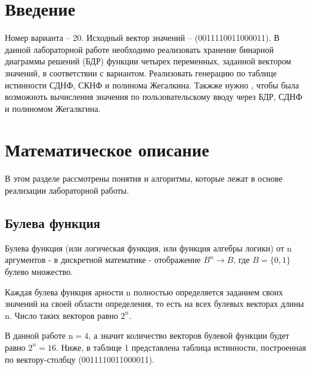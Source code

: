 \documentclass[10pt,a4paper,final]{article} %
\begin{document}
	\tableofcontents
	
	\newpage
	\section* {Введение}
	\par Номер варианта -- 20. Исходный вектор значений -- (0011110011000011). В данной лабораторной работе необходимо реализовать хранение бинарной диаграммы решений (БДР) функции четырех переменных, заданной вектором значений, в соответствии с вариантом. Реализовать генерацию по таблице истинности СДНФ, СКНФ и полинома Жегалкина. Такжже нужно , чтобы была возможноть вычисления значения по пользовательскому вводу через БДР, СДНФ и полиномом Жегалкгина.
	
	\newpage
	\section {Математическое описание}
	В этом разделе рассмотрены понятия и алгоритмы, которые лежат в основе реализации лабораторной работы.
	
	\subsection{Булева функция}
	Булева функция (или логическая функция, или функция алгебры логики) от $\mathrm{n}$ аргументов - в дискретной математике - отображение $B^{n} \rightarrow B$, где $B=\{0,1\}$ булево множество.
	
	Каждая булева функция арности n полностью определяется заданием своих значений на своей области определения, то есть на всех булевых векторах длины $\mathrm{n}$. Число таких векторов равно $2^{n}$.
	
	В данной работе $\mathrm{n}=4$, а значит количество векторов булевой функции будет равно $2^{n}=16$. Ниже, в таблице 1 представлена таблица истинности, построенная по вектору-столбцу (0011110011000011).
	
\end{document}
